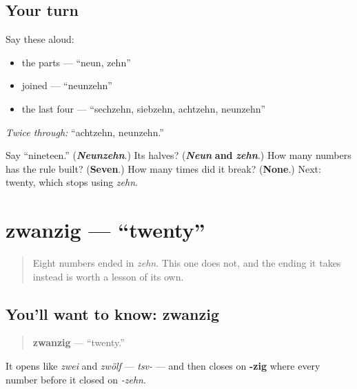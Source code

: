 \subsection*{Your turn}
Say these aloud:

\begin{itemize}
\raggedright
  \item the parts — \textquotedblleft{}neun, zehn\textquotedblright{}
  \item joined — \textquotedblleft{}neunzehn\textquotedblright{}
  \item the last four — \textquotedblleft{}sechzehn, siebzehn, achtzehn, neunzehn\textquotedblright{}
\end{itemize}

\emph{Twice through:} \textquotedblleft{}achtzehn, neunzehn.\textquotedblright{}

\begin{tcolorbox}[breakable,colback=teal!4,colframe=teal!35!black,title={Before you move on}]
Say \textquotedblleft{}nineteen.\textquotedblright{} (\emph{\textbf{Neunzehn}}.) Its halves? (\emph{\textbf{Neun}} \textbf{and} \emph{\textbf{zehn}}.) How many numbers has the rule built? (\textbf{Seven}.) How many times did it break? (\textbf{None}.) Next: twenty, which stops using \emph{zehn}.
\end{tcolorbox}
\section[zwanzig]{zwanzig — \textquotedblleft{}twenty\textquotedblright{}}

\label{lesson:GE-C12-zwanzig}



\begin{quote}
Eight numbers ended in \emph{zehn}. This one does not, and the ending it takes instead is worth a lesson of its own.
\end{quote}

\subsection*{You'll want to know: zwanzig}
\begin{quote}
\textbf{zwanzig} — \textquotedblleft{}twenty.\textquotedblright{}
\end{quote}

It opens like \emph{zwei} and \emph{zwölf} — \emph{tsv-} — and then closes on \textbf{-zig} where every number before it closed on \emph{-zehn}.

